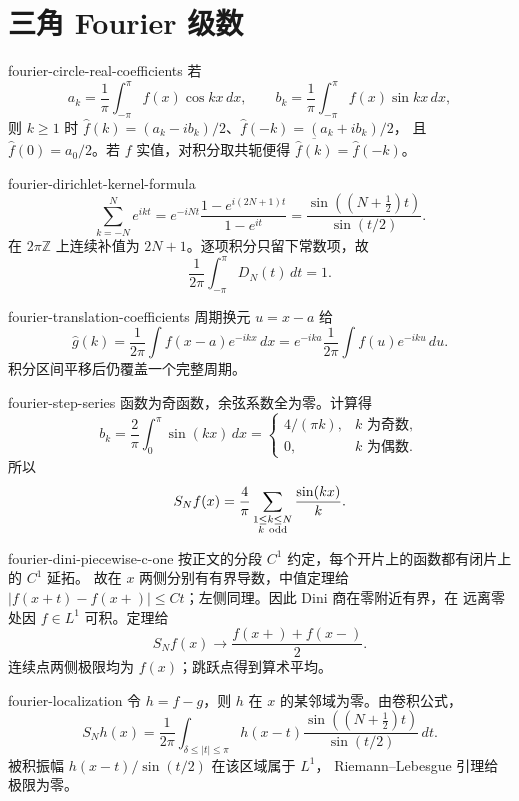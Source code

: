 \chapter{三角 Fourier 级数}

\begin{solution}{fourier-circle-real-coefficients}
若
\[
 a_k=\frac1\pi\int_{-\pi}^{\pi}f(x)\cos kx\,dx,\qquad
 b_k=\frac1\pi\int_{-\pi}^{\pi}f(x)\sin kx\,dx,
\]
则 \(k\ge1\) 时
\(\widehat f(k)=(a_k-ib_k)/2\)、\(\widehat f(-k)=(a_k+ib_k)/2\)，
且 \(\widehat f(0)=a_0/2\)。若 \(f\) 实值，对积分取共轭便得
\(\overline{\widehat f(k)}=\widehat f(-k)\)。
\end{solution}

\begin{solution}{fourier-dirichlet-kernel-formula}
\[
 \sum_{k=-N}^{N}e^{ikt}
 =e^{-iNt}\frac{1-e^{i(2N+1)t}}{1-e^{it}}
 =\frac{\sin((N+\tfrac12)t)}{\sin(t/2)}.
\]
在 \(2\pi\mathbb Z\) 上连续补值为 \(2N+1\)。逐项积分只留下常数项，故
\[
 \frac1{2\pi}\int_{-\pi}^{\pi}D_N(t)\,dt=1.
\]
\end{solution}

\begin{solution}{fourier-translation-coefficients}
周期换元 \(u=x-a\) 给
\[
 \widehat g(k)=\frac1{2\pi}\int f(x-a)e^{-ikx}\,dx
 =e^{-ika}\frac1{2\pi}\int f(u)e^{-iku}\,du.
\]
积分区间平移后仍覆盖一个完整周期。
\end{solution}

\begin{solution}{fourier-step-series}
函数为奇函数，余弦系数全为零。计算得
\[
 b_k=\frac2\pi\int_0^\pi\sin(kx)\,dx
 =\begin{cases}4/(\pi k),&k\text{ 为奇数},\\0,&k\text{ 为偶数}.\end{cases}
\]
所以
\[
 S_Nf(x)=\frac4\pi
 \sum_{\substack{1\le k\le N\\k\ {\rm odd}}}\frac{\sin(kx)}k.
\]
\end{solution}

\begin{solution}{fourier-dini-piecewise-c-one}
按正文的分段 \(C^1\) 约定，每个开片上的函数都有闭片上的 \(C^1\) 延拓。
故在 \(x\) 两侧分别有有界导数，中值定理给
\(|f(x+t)-f(x+)|\le Ct\)；左侧同理。因此 Dini 商在零附近有界，在
远离零处因 \(f\in L^1\) 可积。定理给
\[
 S_Nf(x)\to\frac{f(x+)+f(x-)}2.
\]
连续点两侧极限均为 \(f(x)\)；跳跃点得到算术平均。
\end{solution}

\begin{solution}{fourier-localization}
令 \(h=f-g\)，则 \(h\) 在 \(x\) 的某邻域为零。由卷积公式，
\[
 S_Nh(x)=\frac1{2\pi}\int_{\delta\le|t|\le\pi}
 h(x-t)\frac{\sin((N+\tfrac12)t)}{\sin(t/2)}\,dt.
\]
被积振幅 \(h(x-t)/\sin(t/2)\) 在该区域属于 \(L^1\)，
Riemann--Lebesgue 引理给极限为零。
\end{solution}

